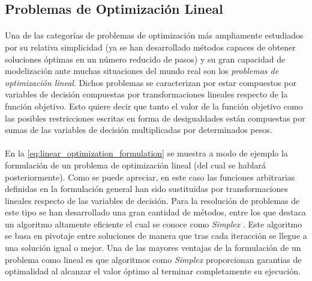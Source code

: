 \documentclass{subfiles}
\begin{document}
      \subsection{Problemas de Optimización Lineal}
      \label{sec:formulation_linear_problems}

        \paragraph{}
        Una de las categorías de problemas de optimización más ampliamente estudiados por su relativa simplicidad (ya se han desarrollado métodos capaces de obtener soluciones óptimas en un número reducido de pasos) y su gran capacidad de modelización ante muchas situaciones del mundo real son los \emph{problemas de optimización lineal}. Dichos problemas se caracterizan por estar compuestos por variables de decisión compuestas por transformaciones lineales respecto de la función objetivo. Esto quiere decir que tanto el valor de la función objetivo como las posibles restricciones escritas en forma de desigualdades están compuestas por sumas de las variables de decisión multiplicadas por determinados pesos.

        \paragraph{}
        En la \cref{eq:linear_optimization_formulation} se muestra a modo de ejemplo la formulación de un problema de optimización lineal (del cual se hablará posteriormente). Como se puede apreciar, en este caso las funciones arbitrarias definidas en la formulación general han sido sustituidas por transformaciones lineales respecto de las variables de decisión. Para la resolución de problemas de este tipo se han desarrollado una gran cantidad de métodos, entre los que destaca un algoritmo altamente eficiente el cual se conoce como \emph{Simplex} \cite{klee1970good}. Este algoritmo se basa en pivotaje entre soluciones de manera que tras cada iteracción se llegue a una solución igual o mejor. Una de las mayores ventajas de la formulación de un problema como lineal es que algoritmos como \emph{Simplex} proporcionan garantias de optimalidad al alcanzar el valor óptimo al terminar completamente su ejecución.
\end{document}
